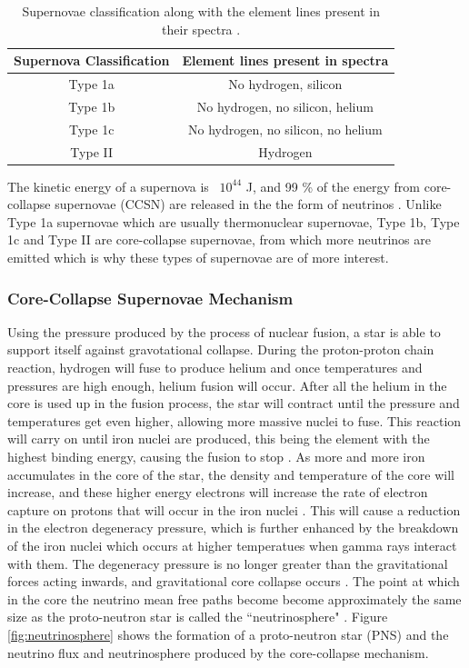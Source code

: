 \begin{table}
\centering
\begin{tabular}{||c c||} 
    \hline
    Supernova Classification & Element lines present in spectra \\ 
    \hline \hline
    Type 1a & No hydrogen, silicon  \\ 
    \hline
    Type 1b & No hydrogen, no silicon, helium  \\
    \hline
    Type 1c & No hydrogen, no silicon, no helium  \\
    \hline
    Type II & Hydrogen  \\
    \hline \hline
\end{tabular}
\caption{Supernovae classification along with the element lines present in their spectra \cite{Gal_Yam_2017}.}
\label{table:supernova_classification}
\end{table}

The kinetic energy of a supernova is ~$10^{44}$ J, and 99 \% of the energy from core-collapse supernovae (CCSN) are released in the the form of neutrinos \cite{scholberg2012supernova}. Unlike Type 1a supernovae which are usually thermonuclear supernovae, Type 1b, Type 1c and Type II are core-collapse supernovae, from which more neutrinos are emitted which is why these types of supernovae are of more interest. 

\subsubsection{Core-Collapse Supernovae Mechanism}

Using the pressure produced by the process of nuclear fusion, a star is able to support itself against gravotational collapse. During the proton-proton chain reaction, hydrogen will fuse to produce helium and once temperatures and pressures are high enough, helium fusion will occur. After all the helium in the core is used up in the fusion process, the star will contract until the pressure and temperatures get even higher, allowing more massive nuclei to fuse. This reaction will carry on until iron nuclei are produced, this being the element with the highest binding energy, causing the fusion to stop \cite{couch2017mechanism}.
\newline
As more and more iron accumulates in the core of the star, the density and temperature of the core will increase, and these higher energy electrons will increase the rate of electron capture on protons that will occur in the iron nuclei \cite{fryer2019gamma}. This will cause a reduction in the electron degeneracy pressure, which is further enhanced by the breakdown of the iron nuclei which occurs at higher temperatues when gamma rays interact with them. The degeneracy pressure is no longer greater than the gravitational forces acting inwards, and gravitational core collapse occurs \cite{ebinger2017global}. 
\newline
The point at which in the core the neutrino mean free paths become become approximately the same size as the proto-neutron star is called the ``neutrinosphere" \cite{PhysRevD.101.023018}.  Figure \ref{fig:neutrinosphere} shows the formation of a proto-neutron star (PNS) and the neutrino flux and neutrinosphere produced by the core-collapse mechanism. 

